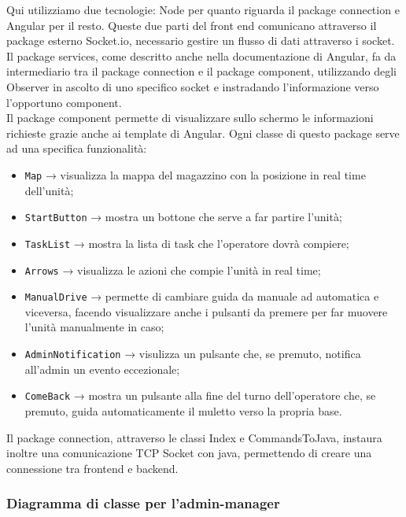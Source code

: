 Qui utilizziamo due tecnologie: Node per quanto riguarda il package connection e Angular per il resto. Queste due parti del front end comunicano attraverso il package esterno Socket.io, necessario gestire un flusso di dati attraverso i socket.\\
Il package services, come descritto anche nella documentazione di Angular, fa da intermediario tra il package connection e il package component, utilizzando degli Observer in ascolto di uno specifico socket e instradando l'informazione verso l'opportuno component.\\
Il package component permette di visualizzare sullo schermo le informazioni richieste grazie anche ai template di Angular. Ogni classe di questo package serve ad una specifica funzionalità:
\begin{itemize}
	\item \texttt{Map} → visualizza la mappa del magazzino con la posizione in real time dell'unità;
	\item \texttt{StartButton} → mostra un bottone che serve a far partire l'unità;
	\item \texttt{TaskList} → mostra la lista di task che l'operatore dovrà compiere;
	\item \texttt{Arrows} → visualizza le azioni che compie l'unità in real time;
	\item \texttt{ManualDrive} → permette di cambiare guida da manuale ad automatica e viceversa, facendo visualizzare anche i pulsanti da premere per far muovere l'unità manualmente in caso;
	\item \texttt{AdminNotification} → visulizza un pulsante che, se premuto, notifica all'admin un evento eccezionale;
	\item \texttt{ComeBack} → mostra un pulsante alla fine del turno dell'operatore che, se premuto, guida automaticamente il muletto verso la propria base.
\end{itemize}
Il package connection, attraverso le classi Index e CommandsToJava, instaura inoltre una comunicazione TCP Socket con java, permettendo di creare una connessione tra frontend e backend.\\

\subsubsection{Diagramma di classe per l'admin-manager}

